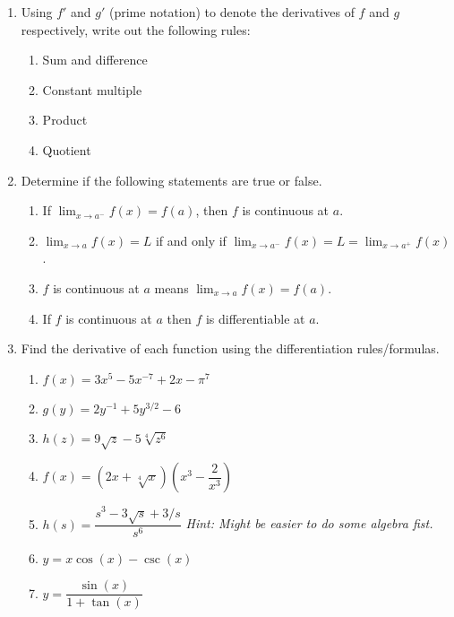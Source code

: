 \documentclass[12pt]{article}
\begin{document}
    \begin{enumerate}
        

\item Using $f'$ and $g'$ (prime notation) to denote the derivatives of $f$ and $g$ respectively, write out the following rules:

\begin{enumerate}
    \item Sum and difference
    \vspace{0.5in}
    \item Constant multiple 
    \vspace{0.5in}
    \item Product
    \vspace{0.5in}
    \item Quotient
    \vspace{0.5in}
\end{enumerate}

\item Determine if the following statements are true or false.

\begin{enumerate}
    \item If $\displaystyle\lim_{x\to a^-} f(x) = f(a)$, then $f$ is continuous at $a$.
    \vspace{1in}
    \item $\displaystyle\lim_{x\to a} f(x) = L$ if and only if $\displaystyle\lim_{x\to a^-} f(x) = L = \displaystyle\lim_{x\to a^+} f(x)$.
    \vspace{1in}
    \item $f$ is continuous at $a$ means $\displaystyle\lim_{x\to a} f(x) = f(a)$.
    \vspace{1in}
    \item If $f$ is continuous at $a$ then $f$ is differentiable at $a$.
    \vspace{1in}
\end{enumerate}
\pagebreak

\item Find the derivative of each function using the differentiation rules/formulas.
\begin{enumerate}
    \item $f(x) = 3x^5-5x^{-7} + 2x - \pi^7$
    \vfill
    \item $g(y) = 2y^{-1} + 5y^{3/2} - 6$
    \vfill
    \item $h(z) = 9\sqrt{z} - 5\sqrt[4]{z^6}$
    \vfill
    \pagebreak
    
    \item $f(x) = \left(2x+\sqrt[4]{x}\right)\left(x^3-\dfrac{2}{x^3}\right)$
    \vfill
    \item $h(s) = \dfrac{s^3-3\sqrt{s}+3/s}{s^6}$ \emph{Hint: Might be easier to do some algebra fist.}
    \vfill
    \pagebreak
    
    \item $y = x\cos(x) - \csc(x)$
    \vfill
    \item $y = \dfrac{\sin(x)}{1+\tan(x)}$
    \vfill
    \end{enumerate}
    \pagebreak

\end{enumerate}
\end{document}
